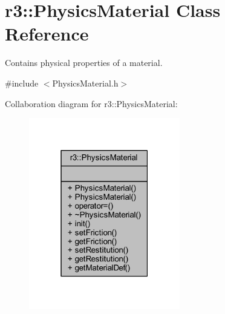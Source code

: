 \hypertarget{classr3_1_1_physics_material}{}\section{r3\+:\+:Physics\+Material Class Reference}
\label{classr3_1_1_physics_material}


Contains physical properties of a material.  




{\ttfamily \#include $<$Physics\+Material.\+h$>$}



Collaboration diagram for r3\+:\+:Physics\+Material\+:\nopagebreak
\begin{figure}[H]
\begin{center}
\leavevmode
\includegraphics[width=187pt]{classr3_1_1_physics_material__coll__graph}
\end{center}
\end{figure}
